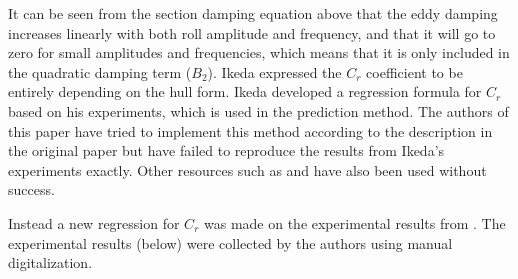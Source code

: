     

    It can be seen from the section damping equation above that the eddy
damping increases linearly with both roll amplitude and frequency, and
that it will go to zero for small amplitudes and frequencies, which
means that it is only included in the quadratic damping term (\(B_2\)).
Ikeda expressed the \(C_r\) coefficient to be entirely depending on the
hull form. Ikeda developed a regression formula for \(C_r\) based on his
experiments, which is used in the prediction method. The authors of this
paper have tried to implement this method according to the description
in the original paper \cite{7505983/4AFVVGNT} but have failed to
reproduce the results from Ikeda's experiments exactly. Other resources
such as \cite{7505983/FB64RGPF} and \cite{7505983/KAKIM2E2} have also
been used without success.

Instead a new regression for \(C_r\) was made on the experimental
results from \cite{7505983/4AFVVGNT}. The experimental results (below)
were collected by the authors using manual digitalization.
 
            
    
